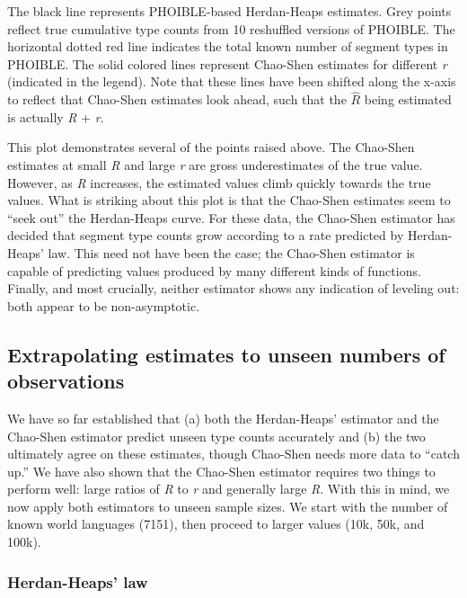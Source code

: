\documentclass[
]{article}
\begin{document}
The black line represents PHOIBLE-based Herdan-Heaps estimates. Grey
points reflect true cumulative type counts from 10 reshuffled versions
of PHOIBLE. The horizontal dotted red line indicates the total known
number of segment types in PHOIBLE. The solid colored lines represent
Chao-Shen estimates for different \emph{r} (indicated in the legend).
Note that these lines have been shifted along the x-axis to reflect that
Chao-Shen estimates look ahead, such that the \(\hat{R}\) being
estimated is actually \emph{R} + \emph{r}.

This plot demonstrates several of the points raised above. The Chao-Shen
estimates at small \emph{R} and large \emph{r} are gross underestimates
of the true value. However, as \emph{R} increases, the estimated values
climb quickly towards the true values. What is striking about this plot
is that the Chao-Shen estimates seem to ``seek out'' the Herdan-Heaps
curve. For these data, the Chao-Shen estimator has decided that segment
type counts grow according to a rate predicted by Herdan-Heaps' law.
This need not have been the case; the Chao-Shen estimator is capable of
predicting values produced by many different kinds of functions.
Finally, and most crucially, neither estimator shows any indication of
leveling out: both appear to be non-asymptotic.

\hypertarget{extrapolating-estimates-to-unseen-numbers-of-observations}{%
\subsection{Extrapolating estimates to unseen numbers of
observations}\label{extrapolating-estimates-to-unseen-numbers-of-observations}}

We have so far established that (a) both the Herdan-Heaps' estimator and
the Chao-Shen estimator predict unseen type counts accurately and (b)
the two ultimately agree on these estimates, though Chao-Shen needs more
data to ``catch up.'' We have also shown that the Chao-Shen estimator
requires two things to perform well: large ratios of \emph{R} to
\emph{r} and generally large \emph{R}. With this in mind, we now apply
both estimators to unseen sample sizes. We start with the number of
known world languages (7151), then proceed to larger values (10k, 50k,
and 100k).

\hypertarget{herdan-heaps-law}{%
\subsubsection{Herdan-Heaps' law}\label{herdan-heaps-law}}
\end{document}
